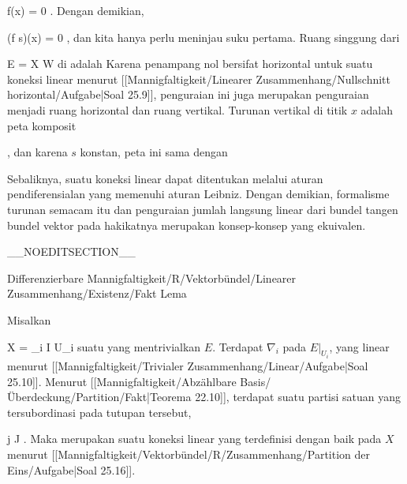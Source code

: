 {\mavergleichskette
{\vergleichskette
{ f(x)
}
{ = }{ 0
}
{  }{
}
{    }{
}
{   }{
}
}
{}{}{}.
Dengan demikian,

\mavergleichskette
{\vergleichskette
{ (f \nabla s)(x)
}
{ = }{ 0
}
{  }{
}
{    }{
}
{   }{
}
}
{}{}{,}
dan kita hanya perlu meninjau suku pertama. Ruang singgung dari

\mavergleichskette
{\vergleichskette
{ E
}
{ = }{ X \times W
}
{  }{
}
{    }{
}
{   }{
}
}
{}{}{}
di
 adalah
Karena penampang nol bersifat horizontal untuk suatu koneksi linear menurut
[[Mannigfaltigkeit/Linearer Zusammenhang/Nullschnitt horizontal/Aufgabe|Soal 25.9]],
penguraian ini juga merupakan penguraian menjadi ruang horizontal dan ruang vertikal. Turunan vertikal
 di titik $x$ adalah peta komposit

 { , }
dan karena $s$ konstan, peta ini sama dengan

}

Sebaliknya, suatu koneksi linear dapat ditentukan melalui aturan pendiferensialan yang memenuhi aturan Leibniz. Dengan demikian, formalisme turunan semacam itu dan penguraian jumlah langsung linear dari bundel tangen bundel vektor pada hakikatnya merupakan konsep-konsep yang ekuivalen.

__NOEDITSECTION__

{Differenzierbare Mannigfaltigkeit/R/Vektorbündel/Linearer Zusammenhang/Existenz/Fakt}
{Lema}
{}
{

\faktzusatz {}
\faktzusatz {}

}
{

Misalkan

\mavergleichskette
{\vergleichskette
{ X
}
{ = }{ \bigcup_{i \in I} U_i
}
{  }{
}
{    }{
}
{   }{
}
}
{}{}{}
suatu
yang mentrivialkan $E$. Terdapat
$\nabla_i$ pada $E\vert_{U_i }$, yang linear menurut
[[Mannigfaltigkeit/Trivialer Zusammenhang/Linear/Aufgabe|Soal 25.10]].
Menurut
[[Mannigfaltigkeit/Abzählbare Basis/Überdeckung/Partition/Fakt|Teorema 22.10]],
terdapat suatu partisi satuan yang tersubordinasi pada tutupan tersebut,

 {}
 {j \in J} {}
 {} {} {} {.}
Maka
 merupakan suatu koneksi linear yang terdefinisi dengan baik pada $X$ menurut
[[Mannigfaltigkeit/Vektorbündel/R/Zusammenhang/Partition der Eins/Aufgabe|Soal 25.16]].

}

